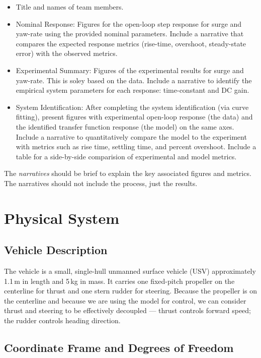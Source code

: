\documentclass[../../book.tex]{subfiles}
\begin{document}
\begin{itemize}
  \item Title and names of team members.
  \item Nominal Response: Figures for the open-loop step response for surge and yaw-rate using the provided nominal parameters.  Include a narrative that compares the expected response metrics (rise-time, overshoot, steady-state error) with the observed metrics.
  \item Experimental Summary: Figures of the experimental results for surge and yaw-rate.   This is soley based on the data.  Include a narrative to identify the empirical system parameters for each response: time-constant and DC gain.
  \item System Identification: After completing the system identification (via curve fitting), present figures with experimental open-loop response (the data) and the identified transfer function response (the model) on the same axes.  Include a narrative to quantitatively compare the model to the experiment with metrics such as rise time, settling time, and percent overshoot.  Include a table for a side-by-side comparision of experimental and model metrics.
\end{itemize}

The \emph{narratives} should be brief to explain the key associated figures and metrics.  The narratives should not include the process, just the results.

\section{Physical System}

\subsection{Vehicle Description}

The vehicle is a small, single-hull unmanned surface vehicle (USV)
approximately 1.1\,m in length and 5\,kg in mass.  It carries one
fixed-pitch propeller on the centerline for thrust and one stern rudder
for steering.  Because the propeller is on the centerline and because we are using the model for control, we can consider thrust and
steering to be effectively decoupled --- thrust controls forward speed;
the rudder controls heading direction.

\subsection{Coordinate Frame and Degrees of Freedom}
\end{document}
